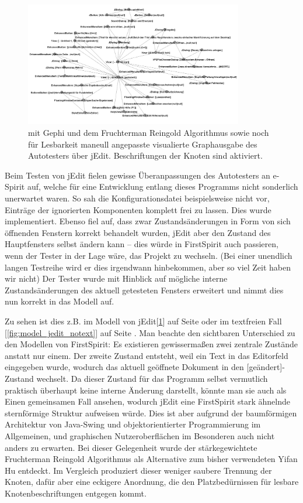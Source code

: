 \begin{figure}
	\centering
	\includegraphics[width=0.85\textwidth]{bilder/model_jedit.png}
	\caption{mit Gephi und dem Fruchterman Reingold Algorithmus\cite{SPE:SPE4380211102}
    sowie noch für Lesbarkeit maneull angepasste visualierte Graphausgabe 
	des Autotesters über jEdit. Beschriftungen der Knoten sind aktiviert.}
	\label{fig:model_jedit}
\end{figure}


Beim Testen von jEdit fielen gewisse Überanpassungen des Autotesters an e-Spirit auf,
welche für eine Entwicklung entlang dieses Programms nicht sonderlich unerwartet
waren. So sah die Konfigurationsdatei beispielsweise nicht vor, Einträge der 
ignorierten Komponenten komplett frei zu lassen. Dies wurde implementiert.
Ebenso fiel auf, dass zwar Zustandsänderungen in Form von sich öffnenden Fenstern
korrekt behandelt wurden, jEdit aber den Zustand des Hauptfensters selbst
ändern kann -- dies würde in FirstSpirit auch passieren, wenn der Tester in der
Lage wäre, das Projekt zu wechseln. (Bei einer unendlich langen Testreihe
wird er dies irgendwann hinbekommen, aber so viel Zeit haben wir nicht)
Der Tester wurde mit Hinblick auf mögliche interne Zustandsänderungen
des aktuell getesteten Fensters erweitert und nimmt dies nun korrekt in
das Modell auf.

Zu sehen ist dies z.B. im Modell von jEdit[\ref{fig:model_jedit}]
auf Seite \pageref{fig:model_jedit} oder im textfreien Fall
[\ref{fig:model_jedit_notext}] auf Seite \pageref{fig:model_jedit_notext}.
Man beachte den sichtbaren Unterschied zu den Modellen von FirstSpirit:
Es existieren gewissermaßen zwei zentrale Zustände anstatt nur einem.
Der zweite Zustand entsteht, weil ein Text in das Editorfeld eingegeben
wurde, wodurch das aktuell geöffnete Dokument in den
\glqq{}[geändert]\grqq{}-Zustand wechselt. Da dieser Zustand
für das Programm selbst vermutlich praktisch überhaupt keine
interne Änderung darstellt, könnte man sie auch als Einen 
gemeinsamen Fall ansehen,
wodurch jEdit eine FirstSpirit stark ähnelnde sternförmige Struktur
aufweisen würde. Dies ist aber aufgrund der baumförmigen
Architektur von Java-Swing und objektorientierter Programmierung
im Allgemeinen, und graphischen Nutzeroberflächen im Besonderen
auch nicht anders zu erwarten. Bei dieser Gelegenheit wurde
der stärkegewichtete 
Fruchterman Reingold Algorithmus\cite{SPE:SPE4380211102}
als Alternative zum bisher verwendeten Yifan Hu\cite{hu2005efficient}
entdeckt. Im Vergleich produziert dieser weniger saubere Trennung
der Knoten, dafür aber eine eckigere Anordnung, die den 
Platzbedürnissen für lesbare Knotenbeschriftungen entgegen kommt.

